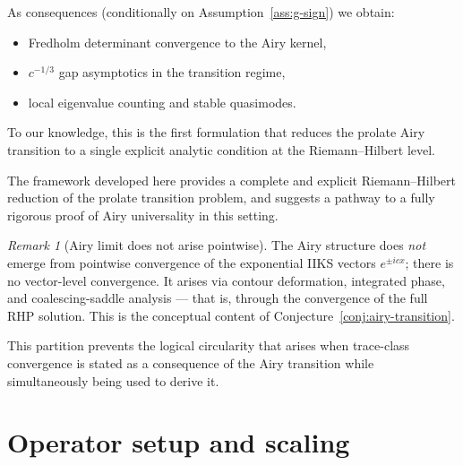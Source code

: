 \documentclass[12pt,a4paper]{amsart}
\theoremstyle{definition}
\theoremstyle{remark}
\newtheorem{remark}[theorem]{Remark}
\begin{document}
As consequences (conditionally on Assumption~\ref{ass:g-sign}) we obtain:
\begin{itemize}
\item Fredholm determinant convergence to the Airy kernel,
\item $c^{-1/3}$ gap asymptotics in the transition regime,
\item local eigenvalue counting and stable quasimodes.
\end{itemize}

To our knowledge, this is the first formulation that reduces
the prolate Airy transition to a single explicit analytic condition
at the Riemann--Hilbert level.

The framework developed here provides a complete and explicit
Riemann--Hilbert reduction of the prolate transition problem,
and suggests a pathway to a fully rigorous proof of Airy
universality in this setting.

\begin{remark}[Airy limit does not arise pointwise]
\label{rem:not-pointwise}
The Airy structure does \emph{not} emerge from pointwise convergence of
the exponential IIKS vectors $e^{\pm icx}$; there is no vector-level
convergence.
It arises via contour deformation, integrated phase, and coalescing-saddle
analysis --- that is, through the convergence of the full RHP solution.
This is the conceptual content of Conjecture~\ref{conj:airy-transition}.
\end{remark}

This partition prevents the logical circularity that arises when
trace-class convergence is stated as a consequence of the Airy transition
while simultaneously being used to derive it.

\begin{center}
\end{center}

\section{Operator setup and scaling}
\label{sec:setup}
\end{document}
